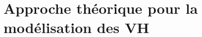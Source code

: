 

\lhead[\fancyplain{}{\leftmark}]%
      {\fancyplain{}{}} %
\chead[\fancyplain{}{}]%
      {\fancyplain{}{}}
\rhead[\fancyplain{}{}]%
      {\fancyplain{}{\rightmark}}%
\lfoot[\fancyplain{}{}]%
      {\fancyplain{}{}}
\cfoot[\fancyplain{}{\thepage}]%
      {\fancyplain{}{\thepage}} %
\rfoot[\fancyplain{}{}]%
     {\fancyplain{}{\scriptsize}}



    					 

\chapter{Approche théorique pour la modélisation des VH}
\label{ch:5_Approche theorique pour la modelisation des VH}

\minitoc
\newpage
	         
